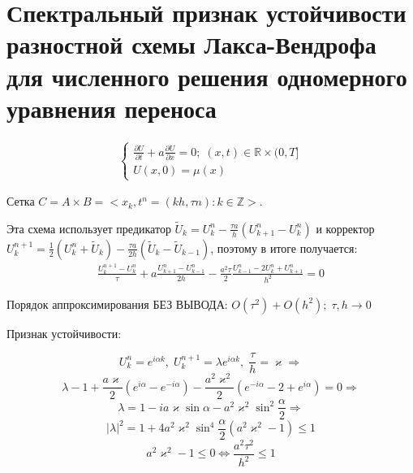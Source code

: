 \documentclass[__main__.tex]{subfiles}
\begin{document}
\section{Спектральный признак устойчивости разностной схемы Лакса-Вендрофа для численного решения одномерного уравнения переноса}

\begin{gather*}
	\begin{cases}
	\frac{\partial U}{\partial t}+a\frac{\partial U}{\partial x}=0;\; (x,t)\in\mathbb{R}\times(0,T]\\
	U(x,0)=\mu(x)
	\end{cases}
\end{gather*}

Сетка $C=A\times B=<x_k,t^n=(kh,\tau n):k\in\mathbb{Z}>.$

Эта схема использует предикатор $\tilde{U}_k=U_k^n-\frac{\tau a}{h}(U_{k+1}^n-U_k^n)$ и корректор $U_k^{n+1}=\frac{1}{2}(U_k^n+\tilde{U}_k)-\frac{\tau a}{2h}(\tilde{U}_k-\tilde{U}_{k-1})$, поэтому в итоге получается:
\begin{gather*}
\frac{U_k^{n+1}-U_k^n}{\tau}+a\frac{U_{k+1}^n-U_{k-1}^n}{2h}-\frac{a^2\tau}{2}\frac{U_{k-1}^n-2U_k^n+U_{k+1}^n}{h^2}=0
\end{gather*}

Порядок аппроксимирования БЕЗ ВЫВОДА: $O(\tau^2)+O(h^2);\;\tau,h\rightarrow0$

Признак устойчивости:

$$	U_k^n=e^{i\alpha k},\;U_k^{n+1}=\lambda e^{i\alpha k},\; \frac{\tau}{h}=\varkappa\Rightarrow $$
$$	\lambda-1+\frac{a\varkappa}{2}(e^{i\alpha}-e^{-i\alpha})-\frac{a^2 \varkappa^2}{2}(e^{-i\alpha}-2+e^{i\alpha})=0\Rightarrow $$
$$	\lambda=1 - i a \varkappa \sin \alpha - a^2 \varkappa^2 \sin^2 \frac{\alpha}{2}\Rightarrow $$ 
$$	|\lambda|^2 = 1 + 4a^2 \varkappa^2 \sin^4 \frac{\alpha}{2}(a^2 \varkappa^2-1)\le 1 $$
$$	a^2 \varkappa^2 - 1\le 0\Leftrightarrow \frac{a^2 \tau^2}{h^2}\le 1 $$
\end{document}
